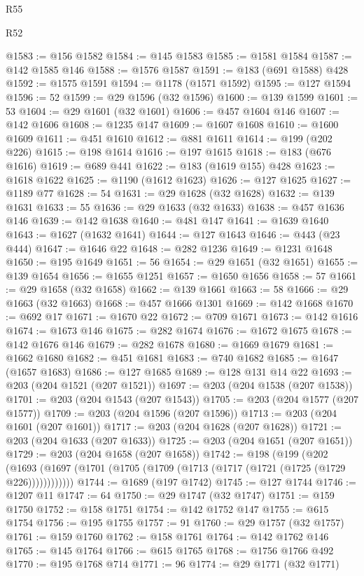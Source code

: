 \begin{lexlean}{R55}
\begin{lexlean}{R52}
\begin{coremodule}
{{{{{{{{{{{{{{{{{{{{{{{{{{{{{{{{{{{{{{{{{{{{{{{{{{{{{{{{{{{{{{{{{{{{{{{{{{{{{{{{{{{{{{{{{{{{{{{{{{{{{{{{{{{{{{{{{{{{{{{{{{{{{{{{{{{{{{{{{{{{{{{{{{{{{{{{{{{{{{{{{{{{{{{{{{{{{{{{{{{{{{{{{{{{{{{{{{{{{{@1583 := @156 @1582
@1584 := @145 @1583
@1585 := @1581 @1584
@1587 := @142 @1585 @146
@1588 := @1576 @1587
@1591 := @183 (@691 @1588) @428
@1592 := @1575 @1591
@1594 := @1178 (@1571 @1592)
@1595 := @127 @1594
@1596 := 52
@1599 := @29 @1596 (@32 @1596)
@1600 := @139 @1599
@1601 := 53
@1604 := @29 @1601 (@32 @1601)
@1606 := @457 @1604 @146
@1607 := @142 @1606
@1608 := @1235 @147
@1609 := @1607 @1608
@1610 := @1600 @1609
@1611 := @451 @1610
@1612 := @881 @1611
@1614 := @199 (@202 @226)
@1615 := @198 @1614
@1616 := @197 @1615
@1618 := @183 (@676 @1616)
@1619 := @689 @441
@1622 := @183 (@1619 @155) @428
@1623 := @1618 @1622
@1625 := @1190 (@1612 @1623)
@1626 := @127 @1625
@1627 := @1189 @77
@1628 := 54
@1631 := @29 @1628 (@32 @1628)
@1632 := @139 @1631
@1633 := 55
@1636 := @29 @1633 (@32 @1633)
@1638 := @457 @1636 @146
@1639 := @142 @1638
@1640 := @481 @147
@1641 := @1639 @1640
@1643 := @1627 (@1632 @1641)
@1644 := @127 @1643
@1646 := @443 (@23 @444)
@1647 := @1646 @22
@1648 := @282 @1236
@1649 := @1231 @1648
@1650 := @195 @1649
@1651 := 56
@1654 := @29 @1651 (@32 @1651)
@1655 := @139 @1654
@1656 := @1655 @1251
@1657 := @1650 @1656
@1658 := 57
@1661 := @29 @1658 (@32 @1658)
@1662 := @139 @1661
@1663 := 58
@1666 := @29 @1663 (@32 @1663)
@1668 := @457 @1666 @1301
@1669 := @142 @1668
@1670 := @692 @17
@1671 := @1670 @22
@1672 := @709 @1671
@1673 := @142 @1616
@1674 := @1673 @146
@1675 := @282 @1674
@1676 := @1672 @1675
@1678 := @142 @1676 @146
@1679 := @282 @1678
@1680 := @1669 @1679
@1681 := @1662 @1680
@1682 := @451 @1681
@1683 := @740 @1682
@1685 := @1647 (@1657 @1683)
@1686 := @127 @1685
@1689 := @128 @131 @14 @22
@1693 := @203 (@204 @1521 (@207 @1521))
@1697 := @203 (@204 @1538 (@207 @1538))
@1701 := @203 (@204 @1543 (@207 @1543))
@1705 := @203 (@204 @1577 (@207 @1577))
@1709 := @203 (@204 @1596 (@207 @1596))
@1713 := @203 (@204 @1601 (@207 @1601))
@1717 := @203 (@204 @1628 (@207 @1628))
@1721 := @203 (@204 @1633 (@207 @1633))
@1725 := @203 (@204 @1651 (@207 @1651))
@1729 := @203 (@204 @1658 (@207 @1658))
@1742 := @198
    (@199
      (@202 (@1693 (@1697 (@1701 (@1705 (@1709 (@1713 (@1717 (@1721 (@1725 (@1729 @226))))))))))))
@1744 := @1689 (@197 @1742)
@1745 := @127 @1744
@1746 := @1207 @11
@1747 := 64
@1750 := @29 @1747 (@32 @1747)
@1751 := @159 @1750
@1752 := @158 @1751
@1754 := @142 @1752 @147
@1755 := @615 @1754
@1756 := @195 @1755
@1757 := 91
@1760 := @29 @1757 (@32 @1757)
@1761 := @159 @1760
@1762 := @158 @1761
@1764 := @142 @1762 @146
@1765 := @145 @1764
@1766 := @615 @1765
@1768 := @1756 @1766 @492
@1770 := @195 @1768 @714
@1771 := 96
@1774 := @29 @1771 (@32 @1771)
}}}}}}}}}}}}}}}}}}}}}}}}}}}}}}}}}}}}}}}}}}}}}}}}}}}}}}}}}}}}}}}}}}}}}}}}}}}}}}}}}}}}}}}}}}}}}}}}}}}}}}}}}}}}}}}}}}}}}}}}}}}}}}}}}}}}}}}}}}}}}}}}}}}}}}}}}}}}}}}}}}}}}}}}}}}}}}}}}}}}}}}}}}}}}}}}}}}}}}
\end{coremodule}
\end{lexlean}
\end{lexlean}
